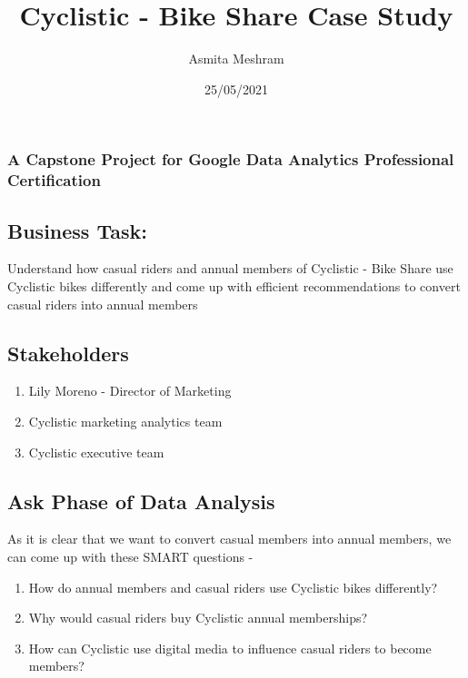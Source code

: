 \documentclass[
]{article}
\title{Cyclistic - Bike Share Case Study}
\author{Asmita Meshram}
\date{25/05/2021}
\begin{document}
\maketitle

\hypertarget{a-capstone-project-for-google-data-analytics-professional-certification}{%
\subsubsection{A Capstone Project for Google Data Analytics Professional
Certification}\label{a-capstone-project-for-google-data-analytics-professional-certification}}

\hypertarget{business-task}{%
\subsection{Business Task:}\label{business-task}}

Understand how casual riders and annual members of Cyclistic - Bike
Share use Cyclistic bikes differently and come up with efficient
recommendations to convert casual riders into annual members

\hypertarget{stakeholders}{%
\subsection{Stakeholders}\label{stakeholders}}

\begin{enumerate}
\def\labelenumi{\arabic{enumi}.}
\item
  Lily Moreno - Director of Marketing
\item
  Cyclistic marketing analytics team
\item
  Cyclistic executive team
\end{enumerate}

\hypertarget{ask-phase-of-data-analysis}{%
\subsection{Ask Phase of Data
Analysis}\label{ask-phase-of-data-analysis}}

As it is clear that we want to convert casual members into annual
members, we can come up with these SMART questions -

\begin{enumerate}
\def\labelenumi{\arabic{enumi}.}
\item
  How do annual members and casual riders use Cyclistic bikes
  differently?
\item
  Why would casual riders buy Cyclistic annual memberships?
\item
  How can Cyclistic use digital media to influence casual riders to
  become members?
\end{enumerate}
\end{document}
